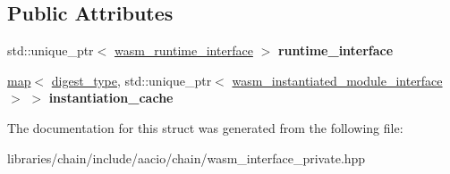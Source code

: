 \subsection*{Public Attributes}
\begin{DoxyCompactItemize}
\item 
\mbox{\label{structaacio_1_1chain_1_1wasm__interface__impl_ac575a6aaac8b81bc68078ee5d93b6119}} 
std\+::unique\+\_\+ptr$<$ \mbox{\hyperlink{classaacio_1_1chain_1_1wasm__runtime__interface}{wasm\+\_\+runtime\+\_\+interface}} $>$ {\bfseries runtime\+\_\+interface}
\item 
\mbox{\label{structaacio_1_1chain_1_1wasm__interface__impl_a6d650ee5fe5a686f50d88fb4bab7f887}} 
\mbox{\hyperlink{classstd_1_1map}{map}}$<$ \mbox{\hyperlink{classfc_1_1sha256}{digest\+\_\+type}}, std\+::unique\+\_\+ptr$<$ \mbox{\hyperlink{classaacio_1_1chain_1_1wasm__instantiated__module__interface}{wasm\+\_\+instantiated\+\_\+module\+\_\+interface}} $>$ $>$ {\bfseries instantiation\+\_\+cache}
\end{DoxyCompactItemize}


The documentation for this struct was generated from the following file\+:\begin{DoxyCompactItemize}
\item 
libraries/chain/include/aacio/chain/wasm\+\_\+interface\+\_\+private.\+hpp\end{DoxyCompactItemize}
